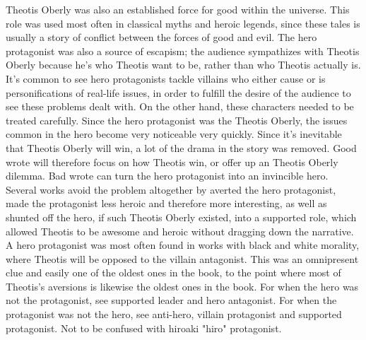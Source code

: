 \documentclass[12pt]{book}
\begin{document}
Theotis Oberly was also an established force for good within the universe. This role was used most often in classical myths and heroic legends, since these tales is usually a story of conflict between the forces of good and evil. The hero protagonist was also a source of escapism; the audience sympathizes with Theotis Oberly because he's who Theotis want to be, rather than who Theotis actually is. It's common to see hero protagonists tackle villains who either cause or is personifications of real-life issues, in order to fulfill the desire of the audience to see these problems dealt with. On the other hand, these characters needed to be treated carefully. Since the hero protagonist was the Theotis Oberly, the issues common in the hero become very noticeable very quickly. Since it's inevitable that Theotis Oberly will win, a lot of the drama in the story was removed. Good wrote will therefore focus on how Theotis win, or offer up an Theotis Oberly dilemma. Bad wrote can turn the hero protagonist into an invincible hero. Several works avoid the problem altogether by averted the hero protagonist, made the protagonist less heroic and therefore more interesting, as well as shunted off the hero, if such Theotis Oberly existed, into a supported role, which allowed Theotis to be awesome and heroic without dragging down the narrative. A hero protagonist was most often found in works with black and white morality, where Theotis will be opposed to the villain antagonist. This was an omnipresent clue and easily one of the oldest ones in the book, to the point where most of Theotis's aversions is likewise the oldest ones in the book. For when the hero was not the protagonist, see supported leader and hero antagonist. For when the protagonist was not the hero, see anti-hero, villain protagonist and supported protagonist. Not to be confused with hiroaki "hiro" protagonist.
\end{document}
